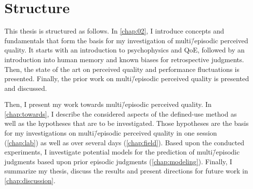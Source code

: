 \section{Structure}
This thesis is structured as follows.
In \autoref{chap:02}, I introduce concepts and fundamentals that form the basis for my investigation of multi\=/episodic perceived quality.
It starts with an introduction to psychophysics and \ac{QoE}, followed by an introduction into human memory and known biases for retrospective judgments.
Then, the state of the art on perceived quality and performance fluctuations is presented.
Finally, the prior work on multi\=/episodic perceived quality is presented and discussed.

Then, I present my work towards multi\=/episodic perceived quality. %
In \autoref{chap:towards}, I describe the considered aspects of the defined-use method as well as the hypotheses that are to be investigated.
Those hypotheses are the basis for my investigations on multi\=/episodic perceived quality in one session (\autoref{chap:lab}) as well as over several days (\autoref{chap:field}).
Based upon the conducted experiments, I investigate potential models for the prediction of multi\=/episodic judgments based upon prior episodic judgments (\autoref{chap:modeling}).
Finally, I summarize my thesis, discuss the results and present directions for future work in \autoref{chap:discussion}.